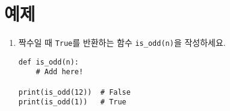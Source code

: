 \documentclass[../main.tex]{subfiles}
\begin{document}
\section{예제}
\begin{enumerate}
\item 짝수일 때 \verb|True|를 반환하는 함수 \verb|is_odd(n)|을 작성하세요.
\begin{verbatim}
def is_odd(n):
    # Add here!

print(is_odd(12))  # False
print(is_odd(1))   # True
\end{verbatim}
%

%


\end{enumerate}
\end{document}
